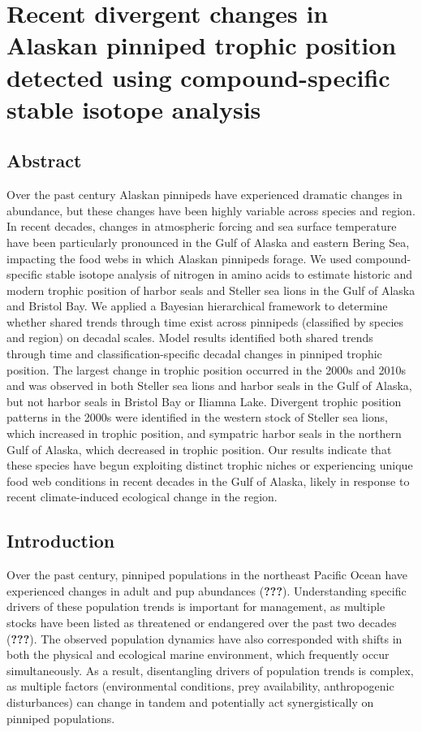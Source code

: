 \documentclass [11pt, proquest] {uwthesis}[2015/03/03]
\begin{document}
\chapter{Recent divergent changes in Alaskan pinniped trophic position
detected using compound-specific stable isotope
analysis}\label{recent-divergent-changes-in-alaskan-pinniped-trophic-position-detected-using-compound-specific-stable-isotope-analysis}

\section{Abstract}\label{abstract-2}

Over the past century Alaskan pinnipeds have experienced dramatic
changes in abundance, but these changes have been highly variable across
species and region. In recent decades, changes in atmospheric forcing
and sea surface temperature have been particularly pronounced in the
Gulf of Alaska and eastern Bering Sea, impacting the food webs in which
Alaskan pinnipeds forage. We used compound-specific stable isotope
analysis of nitrogen in amino acids to estimate historic and modern
trophic position of harbor seals and Steller sea lions in the Gulf of
Alaska and Bristol Bay. We applied a Bayesian hierarchical framework to
determine whether shared trends through time exist across pinnipeds
(classified by species and region) on decadal scales. Model results
identified both shared trends through time and classification-specific
decadal changes in pinniped trophic position. The largest change in
trophic position occurred in the 2000s and 2010s and was observed in
both Steller sea lions and harbor seals in the Gulf of Alaska, but not
harbor seals in Bristol Bay or Iliamna Lake. Divergent trophic position
patterns in the 2000s were identified in the western stock of Steller
sea lions, which increased in trophic position, and sympatric harbor
seals in the northern Gulf of Alaska, which decreased in trophic
position. Our results indicate that these species have begun exploiting
distinct trophic niches or experiencing unique food web conditions in
recent decades in the Gulf of Alaska, likely in response to recent
climate-induced ecological change in the region.

\section{Introduction}\label{introduction-3}

Over the past century, pinniped populations in the northeast Pacific
Ocean have experienced changes in adult and pup abundances
({\textbf{???}}). Understanding specific drivers of these population
trends is important for management, as multiple stocks have been listed
as threatened or endangered over the past two decades ({\textbf{???}}).
The observed population dynamics have also corresponded with shifts in
both the physical and ecological marine environment, which frequently
occur simultaneously. As a result, disentangling drivers of population
trends is complex, as multiple factors (environmental conditions, prey
availability, anthropogenic disturbances) can change in tandem and
potentially act synergistically on pinniped populations.
\end{document}

